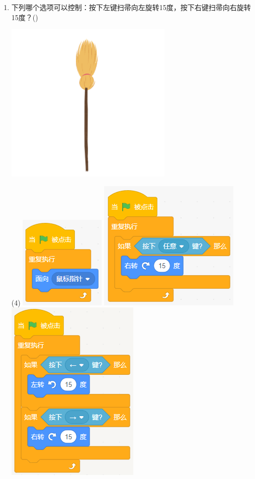 \documentclass[10pt, a4paper]{article}
\newcommand{\hq}{\hfill(\qquad)}
\begin{document}
\begin{enumerate}
        \item 下列哪个选项可以控制：按下左键扫帚向左旋转15度，按下右键扫帚向右旋转15度？\hq
        
        \begin{minipage}{.15\textwidth}
            \centering
            \includegraphics[width=\textwidth]{figure/2.png}
        \end{minipage}
        \begin{minipage}{.75\textwidth}
            \begin{tasks}(4)
                \task \includegraphics[width=.17\textwidth]{figure/2a.png}
                \task \includegraphics[width=.18\textwidth]{figure/2b.png}
                \task \includegraphics[width=.15\textwidth]{figure/2c.png}

\end{tasks}
\end{minipage}
\end{enumerate}
\end{document}
